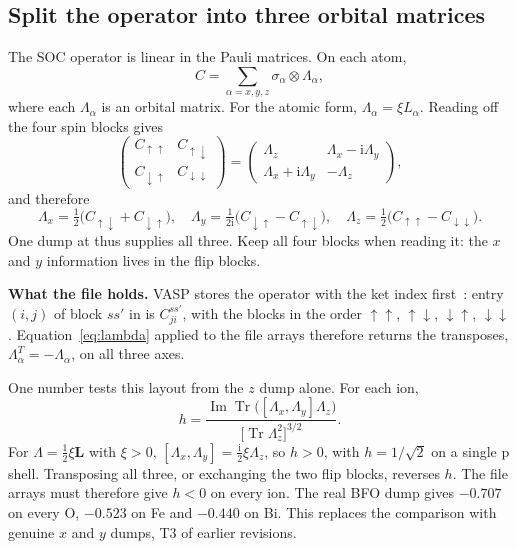 \documentclass[11pt,a4paper]{article}
\numberwithin{equation}{section}
\newcommand{\vct}[1]{\bm{#1}}
\newcommand{\ii}{\mathrm i}
\newcommand{\Tr}{\operatorname{Tr}}
\newcommand{\code}[1]{\texttt{\detokenize{#1}}}
\begin{document}
\subsection{Split the operator into three orbital matrices}

The SOC operator is linear in the Pauli matrices. On each atom,
\begin{equation}\label{eq:split}
 C=\sum_{\alpha=x,y,z}\sigma_\alpha\otimes\Lambda_\alpha,
\end{equation}
where each $\Lambda_\alpha$ is an orbital matrix. For the atomic form,
$\Lambda_\alpha=\xi L_\alpha$. Reading off the four spin blocks gives
\begin{equation}\label{eq:blocks}
 \begin{pmatrix}
 C_{\uparrow\uparrow}&C_{\uparrow\downarrow}\\
 C_{\downarrow\uparrow}&C_{\downarrow\downarrow}
 \end{pmatrix}=
 \begin{pmatrix}
 \Lambda_z&\Lambda_x-\ii\Lambda_y\\
 \Lambda_x+\ii\Lambda_y&-\Lambda_z
 \end{pmatrix},
\end{equation}
and therefore
\begin{equation}\label{eq:lambda}
 \boxed{\Lambda_x=\tfrac12\bigl(C_{\uparrow\downarrow}+C_{\downarrow\uparrow}\bigr),
 \quad
 \Lambda_y=\tfrac{1}{2\ii}\bigl(C_{\downarrow\uparrow}-C_{\uparrow\downarrow}\bigr),
 \quad
 \Lambda_z=\tfrac12\bigl(C_{\uparrow\uparrow}-C_{\downarrow\downarrow}\bigr).}
\end{equation}
One \code{CSO} dump at \code{SAXIS = 0 0 1} thus supplies all three. Keep all
four blocks when reading it: the $x$ and $y$ information lives in the flip
blocks.

\textbf{What the file holds.} VASP stores the operator with the ket index
first~\cite{vaspsrc}: entry $(i,j)$ of block $ss'$ in \code{CSO.dat} is
$C^{ss'}_{ji}$, with the blocks in the order $\uparrow\uparrow$,
$\uparrow\downarrow$, $\downarrow\uparrow$, $\downarrow\downarrow$.
Equation~\eqref{eq:lambda} applied to the file arrays therefore returns the
transposes, $\Lambda_\alpha^{T}=-\Lambda_\alpha$, on all three axes.

One number tests this layout from the $z$ dump alone. For each ion,
\[
 h=\frac{\operatorname{Im}\Tr\bigl([\Lambda_x,\Lambda_y]\Lambda_z\bigr)}
 {\bigl[\Tr\Lambda_z^{2}\bigr]^{3/2}} .
\]
For $\Lambda=\tfrac12\xi\vct L$ with $\xi>0$, $[\Lambda_x,\Lambda_y]=\tfrac{\ii}{2}\xi\Lambda_z$,
so $h>0$, with $h=1/\sqrt2$ on a single p shell. Transposing all three, or
exchanging the two flip blocks, reverses $h$. The file arrays must therefore
give $h<0$ on every ion. The real BFO dump gives $-0.707$ on every O, $-0.523$
on Fe and $-0.440$ on Bi. This replaces the comparison with genuine $x$ and $y$
dumps, T3 of earlier revisions.
\end{document}
